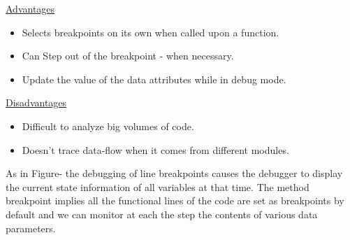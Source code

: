 \documentclass[a4paper,12pt]{article}
\begin{document}
    \underline{Advantages}
    \begin{itemize}
        \item {Selects breakpoints on its own when called upon a function.}
        \item{Can Step out of the breakpoint - when necessary.}
        \item{Update the value of the data attributes while in debug mode.}
    \end{itemize}
    \underline{Disadvantages}
    \begin{itemize}
        \item {Difficult to analyze big volumes of code.}
        \item{Doesn't trace data-flow when it comes from different modules.}
    \end{itemize}
As in Figure- the debugging of line breakpoints causes the debugger to display the current state information of all variables at that time. The method breakpoint implies all the functional lines of the code are set as breakpoints by default and we can monitor at each the step the contents of various data parameters.
\end{document}
